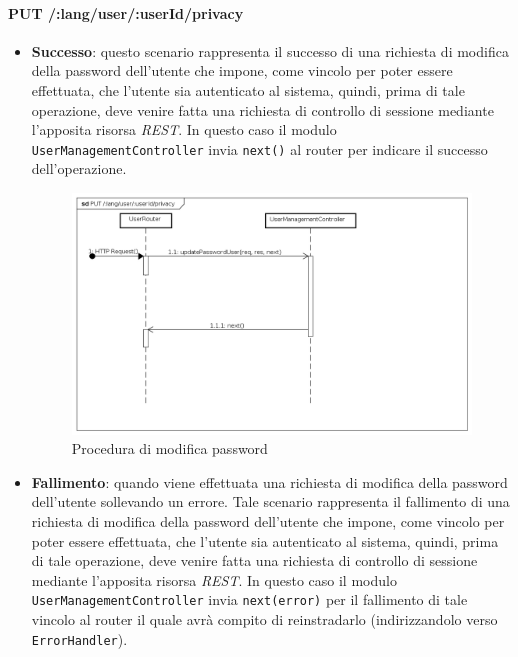 \paragraph{PUT /:lang/user/:userId/privacy}
\begin{itemize}
\item \textbf{Successo}: questo scenario rappresenta il successo di una richiesta di modifica della password dell'utente che impone, come vincolo per poter essere effettuata, che l'utente sia autenticato al sistema, quindi, prima di tale operazione, deve venire fatta una richiesta di controllo di sessione mediante l'apposita risorsa \textit{REST}.  
In questo caso il modulo \texttt{UserManagementController} invia \texttt{next()} al router per indicare il successo dell'operazione.

\label{Procedura di modifica password}
\begin{figure}[ht]
	\centering
	\includegraphics[scale=0.40]{UML/DiagrammiDiSequenza/Back-end/PUT_LangUserUserIdPrivacySuccess.png}
	\caption{Procedura di modifica password}
\end{figure}
\FloatBarrier
\item \textbf{Fallimento}: quando viene effettuata una richiesta di modifica della password dell'utente sollevando un errore. Tale scenario rappresenta il fallimento di una richiesta di modifica della password dell'utente che impone, come vincolo per poter essere effettuata, che l'utente sia autenticato al sistema, quindi, prima di tale operazione, deve venire fatta una richiesta di controllo di sessione mediante l'apposita risorsa \textit{REST}. In questo caso il modulo \texttt{UserManagementController} invia \texttt{next(error)} per il fallimento di tale vincolo al router il quale avrà compito di reinstradarlo (indirizzandolo verso \texttt{ErrorHandler}).




\end{itemize}

